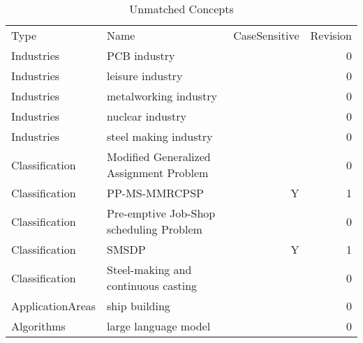 {\scriptsize
\begin{longtable}{lp{10cm}rr}
\rowcolor{white}\caption{Unmatched Concepts}\\ \toprule
\rowcolor{white}Type & Name & CaseSensitive & Revision\\ \midrule
\endhead
\bottomrule
\endfoot
Industries & PCB industry &  & 0\\Industries & leisure industry &  & 0\\Industries & metalworking industry &  & 0\\Industries & nuclear industry &  & 0\\Industries & steel making industry &  & 0\\Classification & Modified Generalized Assignment Problem &  & 0\\Classification & PP-MS-MMRCPSP & Y & 1\\Classification & Pre-emptive Job-Shop scheduling Problem &  & 0\\Classification & SMSDP & Y & 1\\Classification & Steel-making and continuous casting &  & 0\\ApplicationAreas & ship building &  & 0\\Algorithms & large language model &  & 0\\\end{longtable}
}

